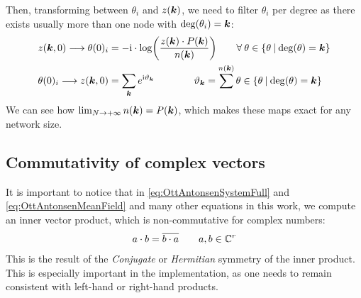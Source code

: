 Then, transforming between $\theta_i$ and $z({\boldsymbol{k}})$, we need to filter $\theta_i$ per degree as there exists usually more than one node with ${\rm deg} ( \theta_i ) = {\boldsymbol{k}}$:
\begin{alignat}{2}
z(\k,0) \longrightarrow \theta(0)_i &= -\ic \cdot \log \left( \frac{z(\k)\cdot P(\k)}{n(\k)} \right) \qquad \forall \: \theta \in \{ \theta \: | \: \degree(\theta) = \k \}  \label{eq:ztottheta}\\
\theta(0)_i \longrightarrow z(\k,0) &= \sum_{\k} e^{\ic \vartheta_{\k}} \qquad \qquad \vartheta_{\k} = \sum^{n(\k)} \theta \in  \label{eq:thetatoz}
\left\{ \theta \: | \: \degree(\theta) = \k \right\}
\end{alignat}
We can see how $\lim_{N \rightarrow +\infty} n({\boldsymbol{k}}) = P({\boldsymbol{k}})$, which makes these maps exact for any network size. 


\subsection{Commutativity of complex vectors} 
It is important to notice that in \eqref{eq:OttAntonsenSystemFull} and \eqref{eq:OttAntonsenMeanField} and many other equations in this work, we compute an inner vector product, which is non-commutative for complex numbers:
\begin{align}
a \cdot b = \overline{b \cdot a} \qquad a, b \in {\mathbb{C}}^r
\end{align}
This is the result of the \textsl{Conjugate} or \textsl{Hermitian} symmetry of the inner product. This is especially important in the \matlab implementation, as one needs to remain consistent with left-hand or right-hand products.


